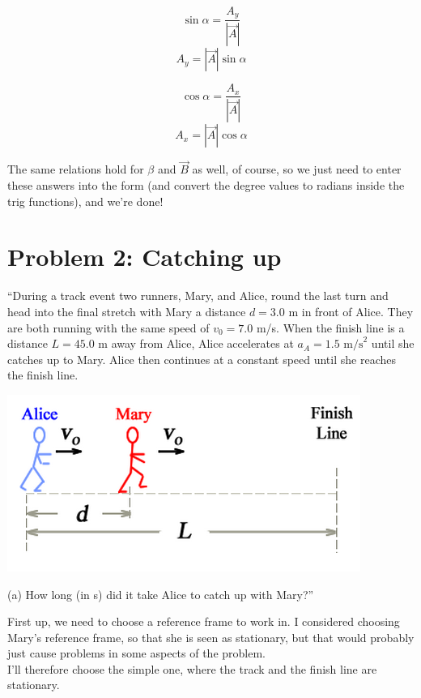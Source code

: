 \documentclass[8.01x]{subfiles}
\begin{document}
\begin{equation}
\sin \alpha = \frac{A_y}{|\vec{A}|}
\end{equation}
\begin{equation}
A_y = |\vec{A}| \sin \alpha
\end{equation}

\begin{equation}
\cos \alpha = \frac{A_x}{|\vec{A}|}
\end{equation}
\begin{equation}
A_x = |\vec{A}| \cos \alpha
\end{equation}

The same relations hold for $\beta$ and $\vec{B}$ as well, of course, so we just need to enter these answers into the form (and convert the degree values to radians inside the trig functions), and we're done!

\section{Problem 2: Catching up}

``During a track event two runners, Mary, and Alice, round the last turn and head into the final stretch with Mary a distance $d = 3.0$ m in front of Alice. They are both running with the same speed of $v_0 = 7.0$ m/s. When the finish line is a distance $L = 45.0$ m away from Alice, Alice accelerates at $a_A = 1.5\text{ m/s}^2$ until she catches up to Mary. Alice then continues at a constant speed until she reaches the finish line.

\begin{center}
\includegraphics[scale=0.8]{Graphics/h1p2}
\end{center}

(a) How long (in s) did it take Alice to catch up with Mary?''

First up, we need to choose a reference frame to work in. I considered choosing Mary's reference frame, so that she is seen as stationary, but that would probably just cause problems in some aspects of the problem.\\
I'll therefore choose the simple one, where the track and the finish line are stationary.
\end{document}

